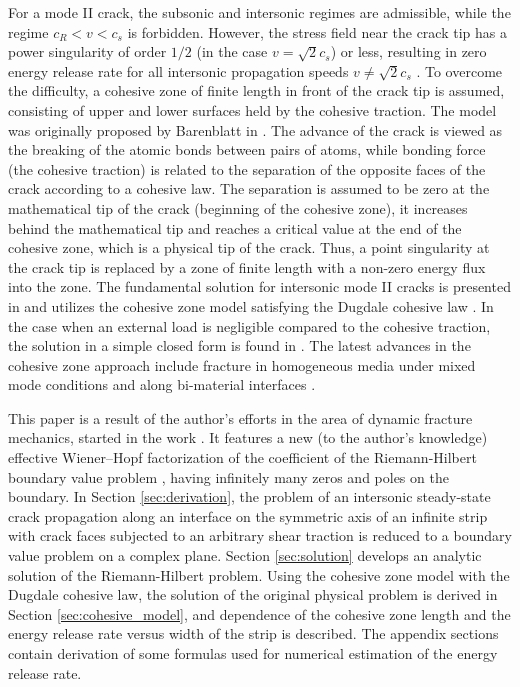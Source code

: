 \documentclass[11pt]{amsart}
\begin{document}
    For a mode II crack, the subsonic and intersonic regimes are admissible, while the regime $c_R<v<c_s$ is forbidden. However, the stress field near the crack tip has a power singularity of order $1/2$ (in the case $v=\sqrt2c_s$) or less, resulting in zero energy release rate for all intersonic propagation speeds $v\neq\sqrt2c_s$ \cite{freund}. To overcome the difficulty, a cohesive zone of finite length in front of the crack tip is assumed, consisting of upper and lower surfaces held by the cohesive traction. The model was originally proposed by Barenblatt in \cite{barenblatt}. The advance of the crack is viewed as the breaking of the atomic bonds between pairs of atoms, while bonding force (the cohesive traction) is related to the separation of the opposite faces of the crack according to a cohesive law. The separation is assumed to be zero at the mathematical tip of the crack (beginning of the cohesive zone), it increases behind the mathematical tip and reaches a critical value at the end of the cohesive zone, which is a physical tip of the crack. Thus, a point singularity at the crack tip is replaced by a zone of finite length with a non-zero energy flux into the zone. The fundamental solution for intersonic mode II cracks is presented in \cite{huang} and utilizes the cohesive zone model satisfying the Dugdale cohesive law \cite{dugdale}. In the case when an external load is negligible compared to the cohesive traction, the solution in a simple closed form is found in \cite{antipov}. The latest advances in the cohesive zone approach include fracture in homogeneous media under mixed mode conditions \cites{ortiz,xu} and along bi-material interfaces \cites{needleman,tvergaard,tvergaard2001}.
    
    This paper is a result of the author's efforts in the area of dynamic fracture mechanics, started in the work \cite{antipov2012}. It features a new (to the author's knowledge) effective Wiener--Hopf factorization of the coefficient of the Riemann-Hilbert boundary value problem \cite{gakhov}, having infinitely many zeros and poles on the boundary. In Section \ref{sec:derivation}, the problem of an intersonic steady-state crack propagation along an interface on the symmetric axis of an infinite strip with crack faces subjected to an arbitrary shear traction is reduced to a boundary value problem on a complex plane. Section \ref{sec:solution} develops an analytic solution of the Riemann-Hilbert problem. Using the cohesive zone model with the Dugdale cohesive law, the solution of the original physical problem is derived in Section \ref{sec:cohesive_model}, and dependence of the cohesive zone length and the energy release rate versus width of the strip is described. The appendix sections contain derivation of some formulas used for numerical estimation of the energy release rate.
\end{document}
